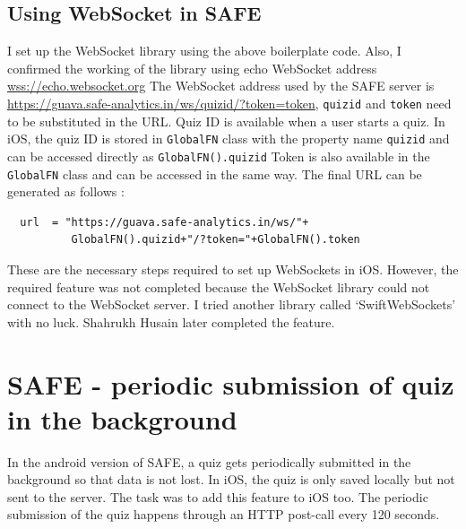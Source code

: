 \documentclass[12pt, conference, a4paper]{article}
\begin{document}
\subsection{Using WebSocket in SAFE}
I set up the WebSocket library using the above boilerplate code. Also, I confirmed the working of the library using echo WebSocket address \url{wss://echo.websocket.org}
The WebSocket address used by the SAFE server is \url{https://guava.safe-analytics.in/ws/quizid/?token=token},
\texttt{quizid} and \texttt{token} need to be substituted in the URL. 
Quiz ID is available when a user starts a quiz. In iOS, the quiz ID is stored in \texttt{GlobalFN} class with the property name \texttt{quizid} and can be accessed directly as \texttt{GlobalFN().quizid} 
Token is also available in the \texttt{GlobalFN} class and can be accessed in the same way. The final URL can be generated as follows : 
\begin{verbatim}
  url  = "https://guava.safe-analytics.in/ws/"+
          GlobalFN().quizid+"/?token="+GlobalFN().token
\end{verbatim}
These are the necessary steps required to set up WebSockets in iOS. However, the required feature was not completed because the WebSocket library could not connect to the WebSocket server. I tried another library called ‘SwiftWebSockets’ with no luck. Shahrukh Husain later completed the feature. 

\section{SAFE - periodic submission of quiz in the background}
\label{SEC: 2}
In the android version of SAFE, a quiz gets periodically submitted in the background so that data is not lost. In iOS, the quiz is only saved locally but not sent to the server. The task was to add this feature to iOS too. 
The periodic submission of the quiz happens through an HTTP post-call every 120 seconds. 
\end{document}

